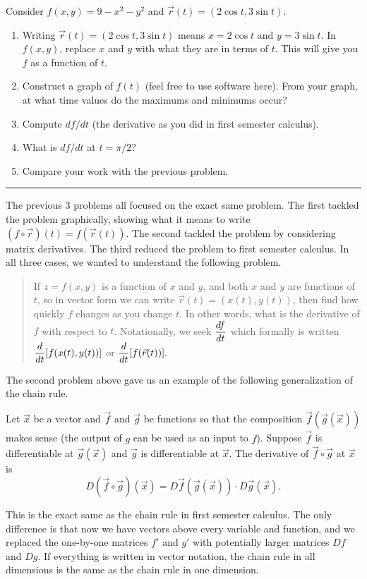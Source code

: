 \begin{problem}
 Consider $f(x,y)=9-x^2-y^2$ and $\vec r(t)=(2\cos t, 3\sin t)$.
\begin{enumerate}
 \item Writing $\vec r(t)=(2\cos t, 3\sin t)$ means $x=2\cos t$ and $y=3\sin t$. In $f(x,y)$, replace $x$ and $y$ with what they are in terms of $t$. This will give you $f$ as a function of $t$. 
 \item Construct a graph of $f(t)$ (feel free to use software here). From your graph, at what time values do the maximums and minimums occur?
 \item Compute $df/dt$ (the derivative as you did in first semester calculus).
 \item What is $df/dt$ at $t=\pi/2$?
 \item Compare your work with the previous problem.
\end{enumerate}
\hrule\end{problem}

The previous 3 problems all focused on the exact same problem.  The first tackled the problem graphically, showing  what it means to write $(f\circ \vec r)(t)=f(\vec r(t))$. The second tackled the problem by considering matrix derivatives.  The third reduced the problem to first semester calculus.  In all three cases, we wanted to understand the following problem.
\begin{quote}
 If $z=f(x,y)$ is a function of $x$ and $y$, and both $x$ and $y$ are functions of $t$, so in vector form we can write $\vec r(t)=(x(t),y(t))$, then find how quickly $f$ changes as you change $t$. In other words, what is the derivative of $f$ with respect to $t$. Notationally, we seek $\displaystyle \frac{df}{dt}$ which formally is written $\displaystyle \frac{d}{dt}[f(x(t),y(t))]$ or $\displaystyle \frac{d}{dt} [f(\vec r(t))].$
\end{quote}
The second problem above gave us an example of the following generalization of the chain rule.
\begin{theorem}
 Let $\vec x$ be a vector and $\vec f$ and $\vec g$ be functions so that the composition $\vec f(\vec g(\vec x))$ makes sense (the output of $g$ can be used as an input to $f$). Suppose $\vec f$ is differentiable at $\vec g(\vec x)$ and $\vec g$ is differentiable at $\vec x$. The derivative of $\vec f\circ \vec g$ at $\vec x$ is 
$$D(\vec f\circ \vec g)(\vec x) = D\vec f(\vec g(\vec x))\cdot D\vec g(\vec x).$$
\end{theorem}
This is the exact same as the chain rule in first semester calculus.  The only difference is that now we have vectors above every variable and function, and we replaced the one-by-one matrices $f'$ and $g'$ with potentially larger matrices $Df$ and $Dg$. If everything is written in vector notation, the chain rule in all dimensions is the same as the chain rule in one dimension.

